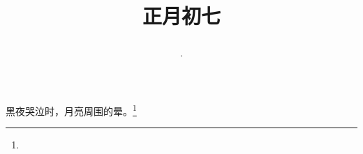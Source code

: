 \title{\date[d=16,m=2,y=2024][year:cn-y,年,month:cn,day:cn,日,·,weekday]·正月初七 }
黑夜哭泣时，月亮周围的晕。\footnote{ }

